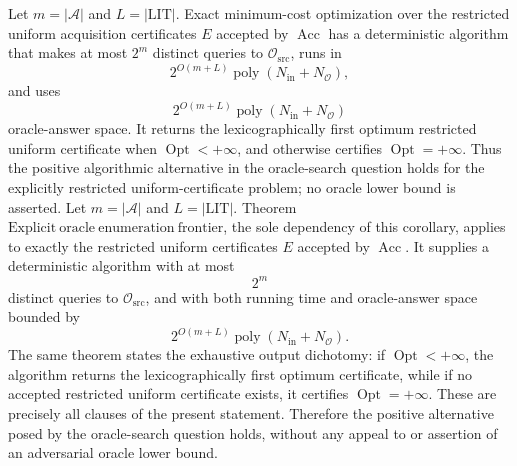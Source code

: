 Let \(m=|\mathcal A|\) and \(L=|\mathrm{LIT}|\).  Exact minimum-cost optimization over the restricted uniform acquisition certificates \(E\) accepted by \(\operatorname{Acc}\) has a deterministic algorithm that makes at most \(2^m\) distinct queries to \(\mathcal O_{\mathrm{src}}\), runs in
\[
 2^{O(m+L)}\operatorname{poly}(N_{\mathrm{in}}+N_{\mathcal O}),
\]
and uses
\[
 2^{O(m+L)}\operatorname{poly}(N_{\mathrm{in}}+N_{\mathcal O})
\]
oracle-answer space.  It returns the lexicographically first optimum restricted uniform certificate when \(\operatorname{Opt}<+\infty\), and otherwise certifies \(\operatorname{Opt}=+\infty\).  Thus the positive algorithmic alternative in the oracle-search question holds for the explicitly restricted uniform-certificate problem; no oracle lower bound is asserted.
Let \(m=|\mathcal A|\) and \(L=|\mathrm{LIT}|\).  Theorem~\(\mathrm{Explicit\ oracle\ enumeration\ frontier}\), the sole dependency of this corollary, applies to exactly the restricted uniform certificates \(E\) accepted by \(\operatorname{Acc}\).  It supplies a deterministic algorithm with at most
\[
 2^m
\]
distinct queries to \(\mathcal O_{\mathrm{src}}\), and with both running time and oracle-answer space bounded by
\[
 2^{O(m+L)}\operatorname{poly}(N_{\mathrm{in}}+N_{\mathcal O}).
\]
The same theorem states the exhaustive output dichotomy: if \(\operatorname{Opt}<+\infty\), the algorithm returns the lexicographically first optimum certificate, while if no accepted restricted uniform certificate exists, it certifies \(\operatorname{Opt}=+\infty\).  These are precisely all clauses of the present statement.  Therefore the positive alternative posed by the oracle-search question holds, without any appeal to or assertion of an adversarial oracle lower bound.
